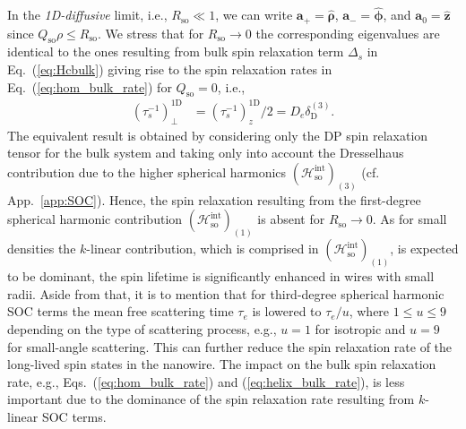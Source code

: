 \documentclass[superscriptaddress,noshowpacs,noshowkeys, twocolumn, floatfix,aps, prb,reprint]{revtex4-1}
\begin{document}
In the \textit{1D-diffusive} limit, i.e., $R_\text{so}\ll 1$, we can write
$\mathbf{a}_+=\boldsymbol{\hat{\rho}}$, $\mathbf{a}_-=\boldsymbol{\hat{\phi}}$, and $\mathbf{a}_0=\mathbf{\hat{z}}$ since $Q_\text{so}\rho \leq R_\text{so}$.  
We stress that for $R_\text{so}\rightarrow 0$ the corresponding eigenvalues 
are identical to the ones resulting from bulk spin relaxation term $\Delta_s$ in Eq.~(\ref{eq:Hcbulk}) giving rise to the spin relaxation rates in Eq.~(\ref{eq:hom_bulk_rate}) for $Q_\text{so}=0$, i.e.,
%
\begin{align}
\left(\tau_s^{-1}\right)_\perp^\text{1D}{}&=\left(\tau_s^{-1}\right)_{z}^\text{1D}/2=D_e\delta_\text{D}^{(3)}.
\label{eq:1D_rate}
\end{align}
%
The equivalent result is obtained by considering only the DP spin relaxation tensor\cite{Zutic2004a} for the bulk system and taking only into account the Dresselhaus contribution due to the higher spherical harmonics $(\mathcal{H}_\text{so}^\text{int})_{(3)}$ (cf. App.~\ref{app:SOC}).
Hence, the spin relaxation resulting from the first-degree spherical harmonic contribution $(\mathcal{H}_\text{so}^\text{int})_{(1)}$ is absent for $R_\text{so}\rightarrow 0$.
As for small densities the $k$-linear contribution, which is comprised in $(\mathcal{H}_\text{so}^\text{int})_{(1)}$, is expected to be dominant, the spin lifetime is significantly enhanced in wires with small radii.
Aside from that, it is to mention that for third-degree spherical harmonic SOC terms the mean free scattering time $\tau_e$ is lowered to $\tau_e/u$, where $1\leq u\leq 9$ depending on the type of scattering process, e.g., $u=1$ for isotropic and $u=9$ for small-angle scattering. \cite{Knap1996,Zutic2004a} 
This can further reduce the spin relaxation rate of the long-lived spin states in the nanowire.
The impact on the bulk spin relaxation rate, e.g., Eqs.~(\ref{eq:hom_bulk_rate}) and (\ref{eq:helix_bulk_rate}), is less important due to the dominance of the spin relaxation rate resulting from $k$-linear SOC terms.
\end{document}
